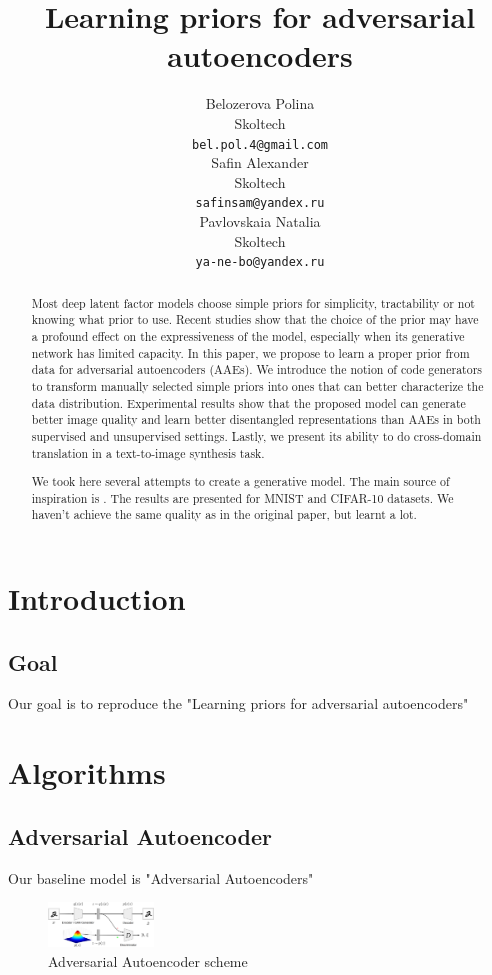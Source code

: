 \documentclass{article}
\title{Learning priors for adversarial autoencoders}
\author{
Belozerova Polina\\
Skoltech\\
\texttt{bel.pol.4@gmail.com} \\
\And
Safin Alexander \\
Skoltech\\
\texttt{safinsam@yandex.ru} \\
\And
Pavlovskaia Natalia \\
Skoltech\\
\texttt{ya-ne-bo@yandex.ru} \\
}
\begin{document}
    \maketitle

    \begin{abstract}
        Most deep latent factor models choose simple priors for simplicity, tractability or
        not knowing what prior to use. Recent studies show that the choice of the prior
        may have a profound effect on the expressiveness of the model, especially when
        its generative network has limited capacity. In this paper, we propose to learn a
        proper prior from data for adversarial autoencoders (AAEs). We introduce the
        notion of code generators to transform manually selected simple priors into ones
        that can better characterize the data distribution. Experimental results show that
        the proposed model can generate better image quality and learn better disentangled
        representations than AAEs in both supervised and unsupervised settings. Lastly,
        we present its ability to do cross-domain translation in a text-to-image synthesis
        task.

        We took here several attempts to create a generative model. The main source of inspiration is \cite{original}.
        The results are presented for MNIST and CIFAR-10 datasets.
        We haven't achieve the same quality as in the original paper, but learnt a lot.
    \end{abstract}

    \section{Introduction}

    \subsection{Goal}
    Our goal is to reproduce the "Learning priors for adversarial autoencoders" \cite{original}

    \section{Algorithms}
    \subsection{Adversarial Autoencoder}
    Our baseline model is "Adversarial Autoencoders" \cite{DBLP:journals/corr/MakhzaniSJG15}
    \begin{center}
        \begin{figure}[H]
            \centering
            \includegraphics[width=0.25\textwidth]{figures/aae.png}
            \caption{Adversarial Autoencoder scheme}
        \end{figure}
    \end{center}
\end{document}
